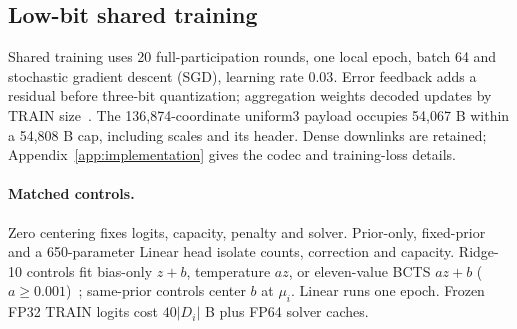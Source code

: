 \subsection{Low-bit shared training}
Shared training uses 20 full-participation rounds, one local epoch, batch 64 and stochastic gradient descent (SGD), learning rate $0.03$. Error feedback adds a residual before three-bit quantization; aggregation weights decoded updates by TRAIN size~\cite{karimireddy2019errorfeedback}. The 136,874-coordinate uniform3 payload occupies 54,067 B within a 54,808 B cap, including scales and its header. Dense downlinks are retained; Appendix~\ref{app:implementation} gives the codec and training-loss details.

\paragraph{Matched controls.}
Zero centering fixes logits, capacity, penalty and solver. Prior-only, fixed-prior and a 650-parameter Linear head isolate counts, correction and capacity. Ridge-10 controls fit bias-only $z+b$, temperature $az$, or eleven-value BCTS $az+b$ ($a\ge0.001$)~\cite{guo2017calibration,alexandari2020labelshift}; same-prior controls center $b$ at $\mu_i$. Linear runs one epoch. Frozen FP32 TRAIN logits cost $40|D_i|$ B plus FP64 solver caches.
